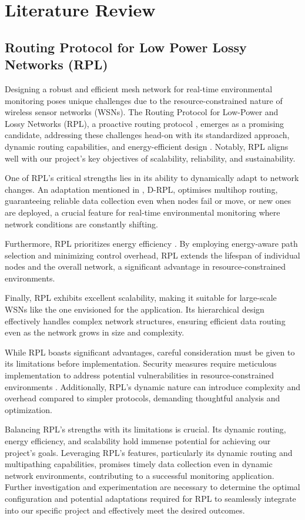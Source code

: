
\section*{Literature Review}

\subsection*{Routing Protocol for Low Power Lossy Networks (RPL)}

Designing a robust and efficient mesh network for real-time environmental monitoring poses unique challenges due to the resource-constrained nature of wireless sensor networks (WSNs). The Routing Protocol for Low-Power and Lossy Networks (RPL), a proactive routing protocol \cite{rechache_study_2021}, emerges as a promising candidate, addressing these challenges head-on with its standardized approach, dynamic routing capabilities, and energy-efficient design \cite{alexander_rpl_2012, Kharrufa2019RPL-Based}. Notably, RPL aligns well with our project's key objectives of scalability, reliability, and sustainability.

One of RPL's critical strengths lies in its ability to dynamically adapt to network changes. An adaptation mentioned in \cite{kharrufa_dynamic_2017}, D-RPL, optimises multihop routing, guaranteeing reliable data collection even when nodes fail or move, or new ones are deployed, a crucial feature for real-time environmental monitoring where network conditions are constantly shifting.

Furthermore, RPL prioritizes energy efficiency \cite{info8040124}. By employing energy-aware path selection and minimizing control overhead, RPL extends the lifespan of individual nodes and the overall network, a significant advantage in resource-constrained environments.

Finally, RPL exhibits excellent scalability, making it suitable for large-scale WSNs like the one envisioned for the application. Its hierarchical design effectively handles complex network structures, ensuring efficient data routing even as the network grows in size and complexity.

While RPL boasts significant advantages, careful consideration must be given to its limitations before implementation. Security measures require meticulous implementation to address potential vulnerabilities in resource-constrained environments \cite{arena_evaluating_2020, mayzaud_distributed_2017, 8998289}. Additionally, RPL's dynamic nature can introduce complexity and overhead compared to simpler protocols, demanding thoughtful analysis and optimization.

Balancing RPL's strengths with its limitations is crucial. Its dynamic routing, energy efficiency, and scalability hold immense potential for achieving our project's goals. Leveraging RPL's features, particularly its dynamic routing and multipathing capabilities, promises timely data collection even in dynamic network environments, contributing to a successful monitoring application. Further investigation and experimentation are necessary to determine the optimal configuration and potential adaptations required for RPL to seamlessly integrate into our specific project and effectively meet the desired outcomes.
